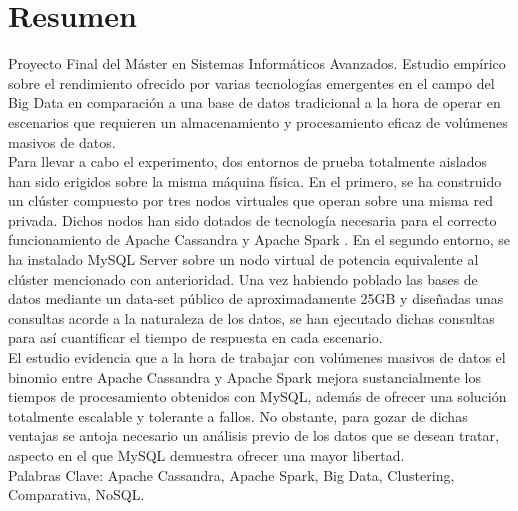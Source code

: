 \section*{Resumen}

Proyecto Final del Máster en Sistemas Informáticos Avanzados. Estudio empírico sobre el rendimiento ofrecido por varias tecnologías emergentes en el campo del Big Data en comparación a una base de datos tradicional a la hora de operar en escenarios que requieren un almacenamiento y procesamiento eficaz de volúmenes masivos de datos.\\

Para llevar a cabo el experimento, dos entornos de prueba totalmente aislados han sido erigidos sobre la misma máquina física. En el primero, se ha construido un clúster compuesto por tres nodos virtuales que operan sobre una misma red privada. Dichos nodos han sido dotados de tecnología necesaria para el correcto funcionamiento de Apache Cassandra \cite{lakshman2010cassandra} y Apache Spark \cite{zaharia2010spark}. En el segundo entorno, se ha instalado MySQL Server sobre un nodo virtual de potencia equivalente al clúster mencionado con anterioridad. Una vez habiendo poblado las bases de datos mediante un data-set público de aproximadamente 25GB y diseñadas unas consultas acorde a la naturaleza de los datos, se han ejecutado dichas consultas para así cuantificar el tiempo de respuesta en cada escenario.\\

El estudio evidencia que a la hora de trabajar con volúmenes masivos de datos el binomio entre Apache Cassandra y Apache Spark mejora sustancialmente los tiempos de procesamiento obtenidos con MySQL, además de ofrecer una solución totalmente escalable y tolerante a fallos. No obstante, para gozar de dichas ventajas  se antoja necesario un análisis previo de los datos que se desean tratar, aspecto en el que MySQL demuestra ofrecer una mayor libertad.\\


Palabras Clave: Apache Cassandra, Apache Spark, Big Data, Clustering, Comparativa, NoSQL.\\
